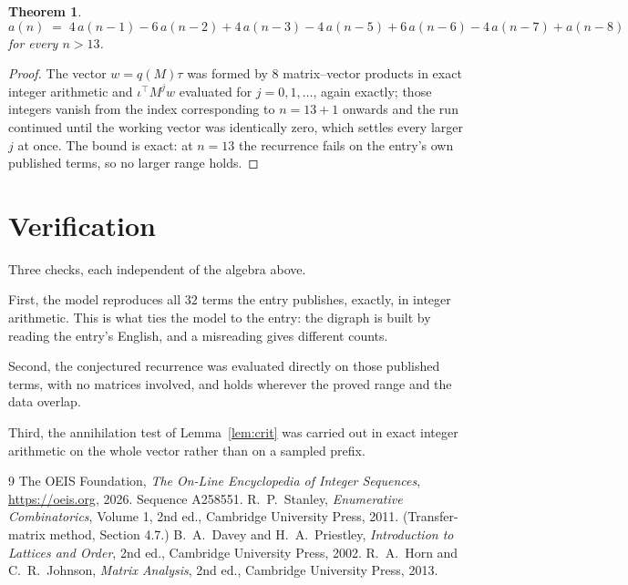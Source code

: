 \documentclass[11pt,a4paper]{article}
\theoremstyle{plain}
\newtheorem{theorem}{Theorem}
\theoremstyle{definition}
\begin{document}
\begin{theorem}
\[
a(n)\;=\;4\,a(n-1) - 6\,a(n-2) + 4\,a(n-3) - 4\,a(n-5) + 6\,a(n-6) - 4\,a(n-7) + a(n-8)
\]
for every $n>13$.
\end{theorem}

\begin{proof}
The vector $w=q(M)\tau$ was formed by $8$ matrix--vector products in exact integer
arithmetic and $\iota^{\!\top}M^{j}w$ evaluated for $j=0,1,\dots$, again exactly; those
integers vanish from the index corresponding to $n=13+1$ onwards and the run continued
until the working vector was identically zero, which settles every larger $j$ at once. The bound is exact: at $n=13$ the recurrence fails on the entry's own published terms, so no larger range holds.
\end{proof}

\section{Verification}

Three checks, each independent of the algebra above.

First, the model reproduces all $32$ terms the entry publishes, exactly, in integer
arithmetic. This is what ties the model to the entry: the digraph is built by reading the
entry's English, and a misreading gives different counts.

Second, the conjectured recurrence was evaluated directly on those published terms, with no
matrices involved, and holds wherever the proved range and the data overlap.

Third, the annihilation test of Lemma~\ref{lem:crit} was carried out in exact integer
arithmetic on the whole vector rather than on a sampled prefix.

\begin{thebibliography}{9}
 The OEIS Foundation, \emph{The On-Line Encyclopedia of Integer
Sequences}, \url{https://oeis.org}, 2026. Sequence A258551.
 R.~P.~Stanley, \emph{Enumerative Combinatorics}, Volume 1, 2nd ed.,
Cambridge University Press, 2011. (Transfer-matrix method, Section 4.7.)
 B.~A.~Davey and H.~A.~Priestley, \emph{Introduction to Lattices and
Order}, 2nd ed., Cambridge University Press, 2002.
 R.~A.~Horn and C.~R.~Johnson, \emph{Matrix Analysis}, 2nd ed., Cambridge
University Press, 2013.
\end{thebibliography}
\end{document}
